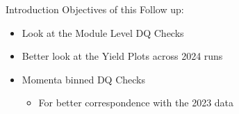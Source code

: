\begin{frame}{Introduction}
    Objectives of this Follow up:
    \begin{itemize}
        \item Look at the Module Level DQ Checks
        \item Better look at the Yield Plots across 2024 runs
        \item Momenta binned DQ Checks 
        \begin{itemize}
            \item For better correspondence with the 2023 data
        \end{itemize}
    \end{itemize}
\end{frame}